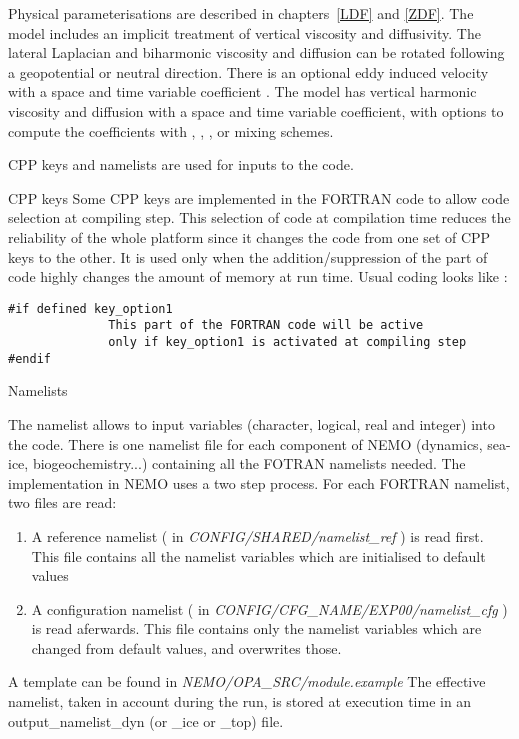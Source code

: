 Physical parameterisations are described in chapters~\ref{LDF} and \ref{ZDF}. The 
model includes an implicit treatment of vertical viscosity and diffusivity. The lateral 
Laplacian and biharmonic viscosity and diffusion can be rotated following a geopotential 
or neutral direction. There is an optional eddy induced velocity \citep{Gent1990} with a 
space and time variable coefficient \citet{Treguier1997}. The model has vertical harmonic 
viscosity and diffusion with a space and time variable coefficient, with options to compute 
the coefficients with \citet{Blanke1993}, \citet{Large_al_RG94}, \citet{Pacanowski_Philander_JPO81}, 
or \citet{Umlauf_Burchard_JMS03} mixing schemes.
 \vspace{1cm}
 
 
\noindent CPP keys and namelists are used for inputs to the code.  \newline

\noindent {} CPP keys \newline
Some CPP keys are implemented in the FORTRAN code to allow code selection at compiling step. This selection of code at compilation time reduces the reliability of the whole platform since it changes the code from one set of CPP keys to the other. It is used only when the addition/suppression of the part of code highly changes the amount of memory at run time.
Usual coding looks like : 
 \vspace{-10pt}
\begin{alltt}
\tiny  
\begin{verbatim}
#if defined key_option1    
	          This part of the FORTRAN code will be active   
	          only if key_option1 is activated at compiling step 
#endif  
\end{verbatim} 
\end{alltt}     


\noindent {} Namelists

The namelist allows to input variables (character, logical, real and integer) into the code. There is one namelist file for each component of NEMO (dynamics, sea-ice, biogeochemistry...) containing all the FOTRAN namelists needed. The implementation in NEMO uses a two step process. For each FORTRAN namelist, two files are read:
\begin{enumerate}
\item A reference namelist ( in \textit{CONFIG/SHARED/namelist\_ref} ) is read first. This file contains all the namelist variables which are initialised to default values  
\item A configuration namelist ( in \textit{CONFIG/CFG\_NAME/EXP00/namelist\_cfg} ) is read aferwards. This file contains only the namelist variables which are changed from default values, and overwrites those.
\end{enumerate}
A template can be found in \textit{NEMO/OPA\_SRC/module.example}
The effective namelist, taken in account during the run, is stored at execution time in an output\_namelist\_dyn (or \_ice or \_top) file.
 \vspace{1cm}



